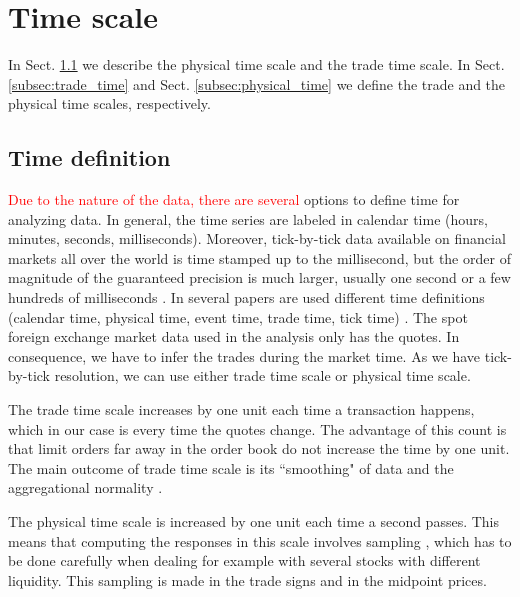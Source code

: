 \section{Time scale}\label{sec:time_scale}

In Sect. \ref{subsec:time_definition} we describe the physical time scale and
the trade time scale. In Sect. \ref{subsec:trade_time} and Sect.
\ref{subsec:physical_time} we define the trade and the physical time scales,
respectively.

\subsection{Time definition}\label{subsec:time_definition}

\textcolor{red}{Due to the nature of the data, there are several} options to define time for
analyzing data. In general, the time series are labeled in calendar time
(hours, minutes, seconds, milliseconds). Moreover, tick-by-tick data available
on financial markets all over the world is time stamped up to the millisecond,
but the order of magnitude of the guaranteed precision is much larger, usually
one second or a few hundreds of milliseconds
\cite{market_digest,empirical_facts}. In several papers are used different time
definitions (calendar time, physical time, event time, trade time, tick time)
\cite{empirical_facts,sampling_returns,market_making}. The spot foreign
exchange market data used in the analysis only has the quotes. In consequence,
we have to infer the trades during the market time. As we have tick-by-tick
resolution, we can use either trade time scale or physical time scale.

The trade time scale increases by one unit each time a transaction happens,
which in our case is every time the quotes change. The advantage of this count
is that limit orders far away in the order book do not increase the time by one
unit. The main outcome of trade time scale is its ``smoothing" of data and the
aggregational normality \cite{empirical_facts}.

The physical time scale is increased by one unit each time a second passes.
This means that computing the responses in this scale involves sampling
\cite{Wang_2016_cross,sampling_returns}, which has to be done carefully when
dealing for example with several stocks with different liquidity. This sampling
is made in the trade signs and in the midpoint prices.

